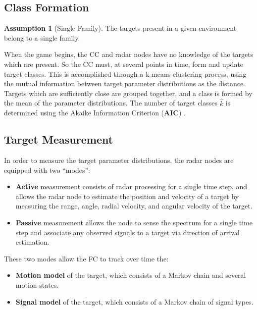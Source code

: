 \documentclass[journal,12pt,onecolumn,draftclsnofoot,]{IEEEtran}
\theoremstyle{definition}
\newtheorem{assumption}{Assumption}
\begin{document}
\subsection{Class Formation}
\begin{assumption}[Single Family]
The targets present in a given environment belong to a single family. 
\end{assumption}

When the game begins, the CC and radar nodes have no knowledge of the targets which are present. 
So the CC must, at several points in time, form and update target classes. 
This is accomplished through a k-means clustering process, using the mutual information between target parameter distributions as the distance. 
Targets which are sufficiently close are grouped together, and a class is formed by the mean of the parameter distributions. 
The number of target classes $\hat{k}$ is determined using the Akaike Information Criterion (\textbf{AIC}) \cite{1311138}. 


\subsection{Target Measurement}
In order to measure the target parameter distributions, the radar nodes are equipped with two ``modes'': 
\begin{itemize}
\item \textbf{Active} measurement consists of radar processing for a single time step, and allows the radar node to estimate the position and velocity of a target by measuring the range, angle, radial velocity, and angular velocity of the target. 
\item \textbf{Passive} measurement allows the node to sense the spectrum for a single time step and associate any observed signals to a target via direction of arrival estimation. 
\end{itemize}

These two modes allow the FC to track over time the: 
\begin{itemize}
\item \textbf{Motion model} of the target, which consists of a Markov chain and several motion states. 
\item \textbf{Signal model} of the target, which consists of a Markov chain of signal types.
\end{itemize}
\end{document}
